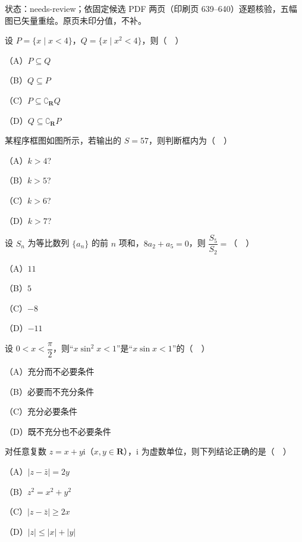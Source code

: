 状态：needs-review；依固定候选 PDF 两页（印刷页 639–640）逐题核验，五幅图已矢量重绘。原页未印分值，不补。
\begin{question}
设 $P=\{x\mid x<4\}$，$Q=\{x\mid x^2<4\}$，则（　）

（A）$P\subseteq Q$

（B）$Q\subseteq P$

（C）$P\subseteq\complement_{\mathbf R}Q$

（D）$Q\subseteq\complement_{\mathbf R}P$

\Needspace{0.4\textheight}
\end{question}
\begingroup
\renewenvironment{question}{\Needspace{0.5\textheight}}{}
\begin{question}
某程序框图如图所示，若输出的 $S=57$，则判断框内为（　）

（A）$k>4$?

（B）$k>5$?

（C）$k>6$?

（D）$k>7$?
\nopagebreak[4]
\begin{center}\end{center}
\nopagebreak[4]
\end{question}
\endgroup
\begin{question}
设 $S_n$ 为等比数列 $\{a_n\}$ 的前 $n$ 项和，$8a_2+a_5=0$，则 $\dfrac{S_5}{S_2}=$（　）

（A）$11$

（B）$5$

（C）$-8$

（D）$-11$

\end{question}
\begin{question}
设 $0<x<\dfrac{\pi}{2}$，则“$x\sin^2x<1$”是“$x\sin x<1$”的（　）

（A）充分而不必要条件

（B）必要而不充分条件

（C）充分必要条件

（D）既不充分也不必要条件

\end{question}
\begin{question}
对任意复数 $z=x+y\mathrm i$（$x,y\in\mathbf R$），$\mathrm i$ 为虚数单位，则下列结论正确的是（　）

（A）$|z-\bar z|=2y$

（B）$z^2=x^2+y^2$

（C）$|z-\bar z|\geqslant 2x$

（D）$|z|\leqslant |x|+|y|$

\end{question}
